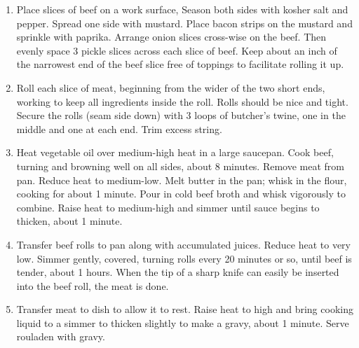 \begin{enumerate}
\item Place slices of beef on a work surface, Season both sides with kosher
  salt and pepper. Spread one side with mustard. Place bacon strips on the
  mustard and sprinkle with paprika. Arrange onion slices cross-wise on the
  beef. Then evenly space 3 pickle slices across each slice of beef. Keep
  about an inch of the narrowest end of the beef slice free of toppings to
  facilitate rolling it up.
\item Roll each slice of meat, beginning from the wider of the two short
  ends, working to keep all ingredients inside the roll. Rolls should be nice
  and tight. Secure the rolls (seam side down) with 3 loops of butcher's
  twine, one in the middle and one at each end. Trim excess string.
\item Heat vegetable oil over medium-high heat in a large saucepan. Cook
  beef, turning and browning well on all sides, about 8 minutes. Remove meat
  from pan. Reduce heat to medium-low. Melt butter in the pan; whisk in the
  flour, cooking for about 1 minute. Pour in cold beef broth and whisk
  vigorously to combine. Raise heat to medium-high and simmer until sauce
  begins to thicken, about 1 minute.
\item Transfer beef rolls to pan along with accumulated juices. Reduce heat
  to very low. Simmer gently, covered, turning rolls every 20 minutes or so,
  until beef is tender, about 1  hours. When the tip of a
  sharp knife can easily be inserted into the beef roll, the meat is done.
\item Transfer meat to dish to allow it to rest. Raise heat to high and bring
  cooking liquid to a simmer to thicken slightly to make a gravy, about 1
  minute. Serve rouladen with gravy.
\end{enumerate}

